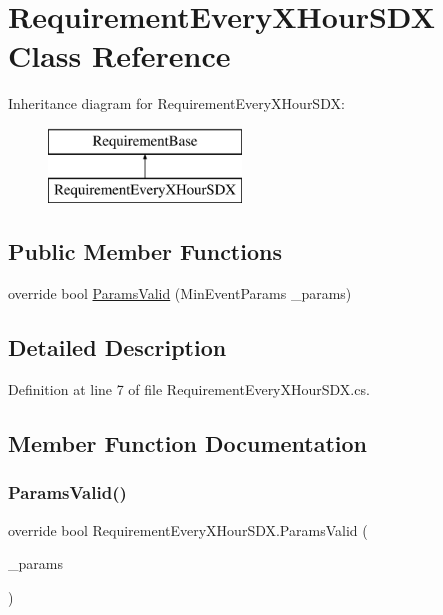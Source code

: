 \hypertarget{class_requirement_every_x_hour_s_d_x}{}\section{Requirement\+Every\+X\+Hour\+S\+DX Class Reference}
\label{class_requirement_every_x_hour_s_d_x}
Inheritance diagram for Requirement\+Every\+X\+Hour\+S\+DX\+:\begin{figure}[H]
\begin{center}
\leavevmode
\includegraphics[height=2.000000cm]{class_requirement_every_x_hour_s_d_x}
\end{center}
\end{figure}
\subsection*{Public Member Functions}
\begin{DoxyCompactItemize}
\item 
override bool \mbox{\hyperlink{class_requirement_every_x_hour_s_d_x_ade5438346dff0899e0a4a92500a01ffc}{Params\+Valid}} (Min\+Event\+Params \+\_\+params)
\end{DoxyCompactItemize}


\subsection{Detailed Description}


Definition at line 7 of file Requirement\+Every\+X\+Hour\+S\+D\+X.\+cs.



\subsection{Member Function Documentation}
\mbox{\label{class_requirement_every_x_hour_s_d_x_ade5438346dff0899e0a4a92500a01ffc}} 
\subsubsection{\texorpdfstring{ParamsValid()}{ParamsValid()}}
{\footnotesize\ttfamily override bool Requirement\+Every\+X\+Hour\+S\+D\+X.\+Params\+Valid (\begin{DoxyParamCaption}\item[{Min\+Event\+Params}]{\+\_\+params }\end{DoxyParamCaption})}



